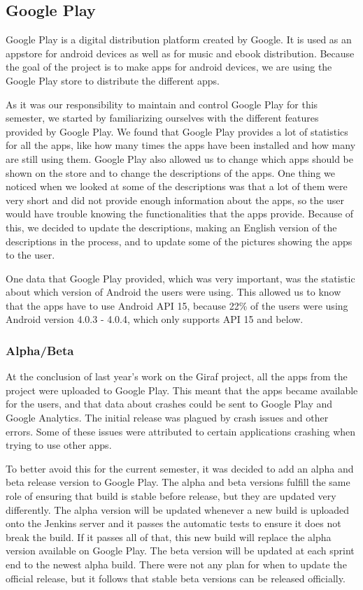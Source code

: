 \subsection{Google Play}
Google Play is a digital distribution platform created by Google. It is used as an appstore for android devices as well as for music and ebook distribution. Because the goal of the project is to make apps for android devices, we are using the Google Play store to distribute the different apps. \citep{GooglePlay}

As it was our responsibility to maintain and control Google Play for this semester, we started by familiarizing ourselves with the different features provided by Google Play. We found that Google Play provides a lot of statistics for all the apps, like how many times the apps have been installed and how many are still using them. Google Play also allowed us to change which apps should be shown on the store and to change the descriptions of the apps. One thing we noticed when we looked at some of the descriptions was that a lot of them were very short and did not provide enough information about the apps, so the user would have trouble knowing the functionalities that the apps provide. Because of this, we decided to update the descriptions, making an English version of the descriptions in the process, and to update some of the pictures showing the apps to the user.

One data that Google Play provided, which was very important, was the statistic about which version of Android the users were using. This allowed us to know that the apps have to use Android API 15, because 22\% of the users were using Android version 4.0.3 - 4.0.4, which only supports API 15 and below. \citep{API15} 

\subsubsection{Alpha/Beta}
At the conclusion of last year's work on the Giraf project, all the apps from the project were uploaded to Google Play. This meant that the apps became available for the users, and that data about crashes could be sent to Google Play and Google Analytics. The initial release was plagued by crash issues and other errors. Some of these issues were attributed to certain applications crashing when trying to use other apps.

To better avoid this for the current semester, it was decided to add an alpha and beta release version to Google Play. The alpha and beta versions fulfill the same role of ensuring that build is stable before release, but they are updated very differently. The alpha version will be updated whenever a new build is uploaded onto the Jenkins server and it passes the automatic tests to ensure it does not break the build. If it passes all of that, this new build will replace the alpha version available on Google Play. The beta version will be updated at each sprint end to the newest alpha build. There were not any plan for when to update the official release, but it follows that stable beta versions can be released officially.

